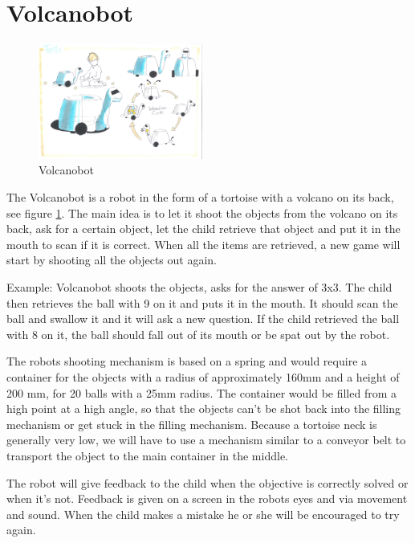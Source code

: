 \documentclass[11pt,twoside,a4paper]{report}
\begin{document}
\section{Volcanobot}
\begin{figure}
  \begin{center}
    \includegraphics[width=0.48\textwidth]{Images/VolcanoBotConcept.pdf}
  \end{center}
  \caption{Volcanobot}
  \label{figure:volcanobot}
\end{figure}
The Volcanobot is a robot in the form of a tortoise with a volcano on its back, see figure \ref{figure:volcanobot}. The main idea is to let it shoot the objects from the volcano on its back, ask for a certain object, let the child retrieve that object and put it in the mouth to scan if it is correct. When all the items are retrieved, a new game will start by shooting all the objects out again.

Example: Volcanobot shoots the objects, asks for the answer of 3x3. The child then retrieves the ball with 9 on it and puts it in the mouth. It should scan the ball and swallow it and it will ask a new question. If the child retrieved the ball with 8 on it, the ball should fall out of its mouth or be spat out by the robot.

The robots shooting mechanism is based on a spring and would require a container for the objects with a radius of approximately 160mm and a height of 200 mm, for 20 balls with a 25mm radius. The container would be filled from a high point at a high angle, so that the objects can\rq{}t be shot back into the filling mechanism or get stuck in the filling mechanism. Because a tortoise neck is generally very low, we will have to use a mechanism similar to a conveyor belt to transport the object to the main container in the middle.

The robot will give feedback to the child when the objective is correctly solved or when it\rq{}s not. Feedback is given on a screen in the robots eyes and via movement and sound. When the child makes a mistake he or she will be encouraged to try again.
\end{document}
